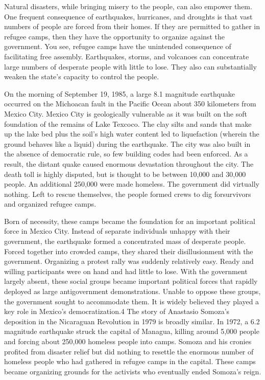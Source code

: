 \documentclass[10pt]{article}
\begin{document}
{\large Natural disasters, while bringing misery to the people, can also empower
them. One frequent consequence of earthquakes, hurricanes, and droughts is that
vast numbers of people are forced from their homes. If they are permitted to
gather in refugee camps, then they have the opportunity to organize against the
government. You see, refugee camps have the unintended consequence of
facilitating free assembly. Earthquakes, storms, and volcanoes can concentrate
large numbers of desperate people with little to lose. They also can
substantially weaken the state's capacity to control the people.}

{\large On the morning of September 19, 1985, a large 8.1 magnitude earthquake
occurred on the Michoacan fault in the Pacific Ocean about 350 kilometers from
Mexico City. Mexico City is geologically vulnerable as it was built on the soft
foundation of the remains of Lake Texcoco. The clay silts and sands that make up
the lake bed plus the soil's high water content led to liquefaction (wherein the
ground behaves like a liquid) during the earthquake. The city was also built in
the absence of democratic rule, so few building codes had been enforced. As a
result, the distant quake caused enormous devastation throughout the city. The
death toll is highly disputed, but is thought to be between 10,000 and 30,000
people. An additional 250,000 were made homeless. The government did virtually
nothing. Left to rescue themselves, the people formed crews to dig forsurvivors
and organized refugee camps.}

{\large Born of necessity, these camps became the foundation for an important
political force in Mexico City. Instead of separate individuals unhappy with
their government, the earthquake formed a concentrated mass of desperate people.
Forced together into crowded camps, they shared their disillusionment with the
government. Organizing a protest rally was suddenly relatively easy. Ready and
willing participants were on hand and had little to lose. With the government
largely absent, these social groups became important political forces that
rapidly deployed as large antigovernment demonstrations. Unable to oppose these
groups, the government sought to accommodate them. It is widely believed they
played a key role in Mexico's democratization.4 The story of Anastasio Somoza's
deposition in the Nicaraguan Revolution in 1979 is broadly similar. In 1972, a
6.2 magnitude earthquake struck the capital of Managua, killing around 5,000
people and forcing about 250,000 homeless people into camps. Somoza and his
cronies profited from disaster relief but did nothing to resettle the enormous
number of homeless people who had gathered in refugee camps in the capital. These
camps became organizing grounds for the activists who eventually ended Somoza's
reign.}
\end{document}
